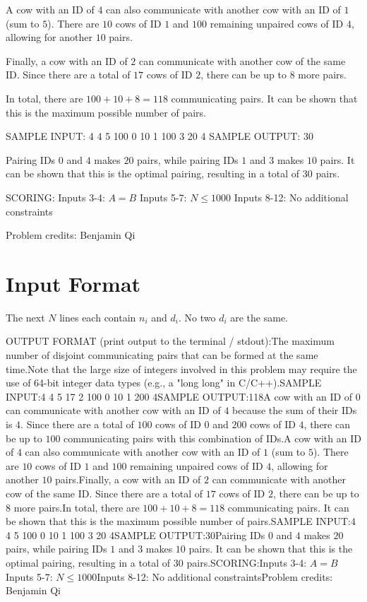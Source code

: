 \documentclass[12pt]{article}
\begin{document}
A cow with an ID of $4$ can also communicate with another cow with an ID of $1$
(sum to $5$). There are $10$ cows of ID $1$ and $100$ remaining unpaired cows of
ID $4$, allowing for another $10$ pairs.

Finally, a cow with an ID of $2$ can communicate with another cow of the same
ID.  Since there are a total of $17$ cows of ID $2$, there can be up to $8$ more
pairs.

In total, there are $100+10+8=118$ communicating pairs. It can be shown that
this is the maximum possible number of pairs.

SAMPLE INPUT:
4 4 5
100 0
10 1
100 3
20 4
SAMPLE OUTPUT: 
30

Pairing IDs $0$ and $4$ makes $20$ pairs, while pairing IDs $1$ and $3$ makes
$10$ pairs. It can be shown that this is the optimal pairing, resulting in a
total of $30$ pairs.

SCORING:
Inputs 3-4: $A=B$ Inputs 5-7: $N\le 1000$ Inputs 8-12: No additional constraints


Problem credits: Benjamin Qi



\section*{Input Format}
The next $N$ lines each contain $n_i$ and $d_i$. No two $d_i$ are the same.

OUTPUT FORMAT (print output to the terminal / stdout):The maximum number of disjoint communicating pairs that can be formed at the
same time.Note that the large size of integers involved in this problem may require the
use of 64-bit integer data types (e.g., a "long long" in C/C++).SAMPLE INPUT:4 4 5
17 2
100 0
10 1
200 4SAMPLE OUTPUT:118A cow with an ID of $0$ can communicate with another cow with an ID of $4$
because the sum of their IDs is $4$.  Since there are a total of $100$ cows of
ID $0$ and $200$ cows of ID $4$,  there can be up to $100$ communicating pairs
with this combination of IDs.A cow with an ID of $4$ can also communicate with another cow with an ID of $1$
(sum to $5$). There are $10$ cows of ID $1$ and $100$ remaining unpaired cows of
ID $4$, allowing for another $10$ pairs.Finally, a cow with an ID of $2$ can communicate with another cow of the same
ID.  Since there are a total of $17$ cows of ID $2$, there can be up to $8$ more
pairs.In total, there are $100+10+8=118$ communicating pairs. It can be shown that
this is the maximum possible number of pairs.SAMPLE INPUT:4 4 5
100 0
10 1
100 3
20 4SAMPLE OUTPUT:30Pairing IDs $0$ and $4$ makes $20$ pairs, while pairing IDs $1$ and $3$ makes
$10$ pairs. It can be shown that this is the optimal pairing, resulting in a
total of $30$ pairs.SCORING:Inputs 3-4: $A=B$Inputs 5-7: $N\le 1000$Inputs 8-12: No additional constraintsProblem credits: Benjamin Qi
\end{document}
